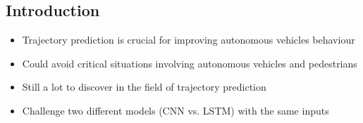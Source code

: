 \documentclass[a0,portrait]{a0poster}
\begin{document}
\begin{multicols}{2} %


\color{DarkSlateGray}%





\color{DarkSlateGray} %

\section*{Introduction}

\begin{itemize}
	\justifying
\item Trajectory prediction is crucial for improving autonomous vehicles behaviour
\item Could avoid critical situations involving autonomous vehicles and pedestrians
\item Still a lot to discover in the field of trajectory prediction
\item Challenge two different models (CNN vs. LSTM) with the same inputs
\end{itemize}



\color{DarkSlateGray} %


\end{multicols}
\end{document}
